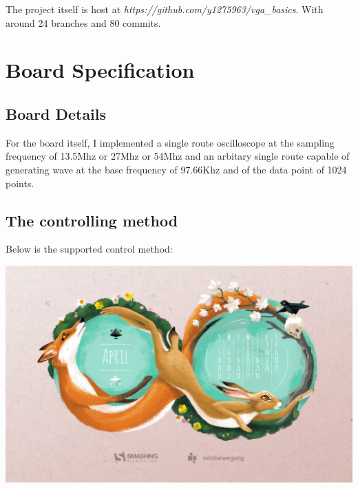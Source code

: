 \documentclass[11pt]{scrartcl}
\begin{document}
The project itself is host at \textit{https://github.com/y1275963/vga\_basics}. With around 24 branches and 80 commits.\\


\section{Board Specification}
\subsection{Board Details}
For the board itself, I implemented a single route oscilloscope at the sampling frequency of 13.5Mhz or 27Mhz or 54Mhz and an arbitary single route capable of generating wave at the base frequency of 97.66Khz and of the data point of 1024 points.%
\subsection{The controlling method}

Below is the supported control method:

\begin{center}     
\begin{minipage}[t]{\linewidth}

{
\includegraphics[scale = 0.1]{apr.jpg}
}
\end{minipage}
\medskip
\end{center}
\end{document}
